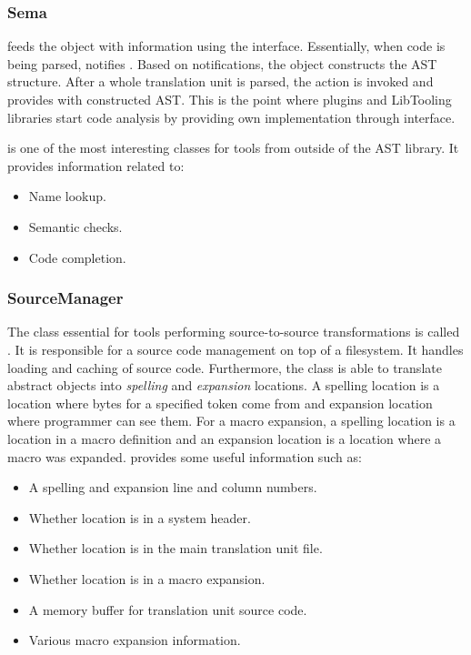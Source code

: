 \subsubsection{Sema}
 feeds the  object with information using the  interface. Essentially, when code is being parsed,  notifies . Based on notifications, the  object constructs the AST structure. After a whole translation unit is parsed, the  action is invoked and  provides  with constructed AST. This is the point where plugins and LibTooling libraries start code analysis by providing own  implementation through  interface.

 is one of the most interesting classes for tools from outside of the AST library. It provides information related to:

\begin{itemize}
\item Name lookup.
\item Semantic checks.
\item Code completion.
\end{itemize}

\subsubsection{SourceManager}
The class essential for tools performing source-to-source transformations is called . It is responsible for a source code management on top of a filesystem. It handles loading and caching of source code. Furthermore, the class is able to translate abstract  objects into \emph{spelling} and \emph{expansion} locations. A spelling location is a location where bytes for a specified token come from and expansion location where programmer can see them. For a macro expansion, a spelling location is a location in a macro definition and an expansion location is a location where a macro was expanded.  provides some useful information such as:

\begin{itemize}
\item A spelling and expansion line and column numbers.
\item Whether location is in a system header.
\item Whether location is in the main translation unit file.
\item Whether location is in a macro expansion.
\item A memory buffer for translation unit source code.
\item Various macro expansion information.
\end{itemize}

